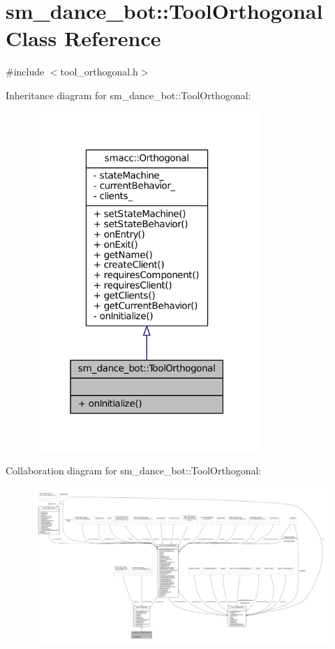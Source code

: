 \hypertarget{classsm__dance__bot_1_1ToolOrthogonal}{}\section{sm\+\_\+dance\+\_\+bot\+:\+:Tool\+Orthogonal Class Reference}
\label{classsm__dance__bot_1_1ToolOrthogonal}


{\ttfamily \#include $<$tool\+\_\+orthogonal.\+h$>$}



Inheritance diagram for sm\+\_\+dance\+\_\+bot\+:\+:Tool\+Orthogonal\+:
\nopagebreak
\begin{figure}[H]
\begin{center}
\leavevmode
\includegraphics[width=244pt]{classsm__dance__bot_1_1ToolOrthogonal__inherit__graph}
\end{center}
\end{figure}


Collaboration diagram for sm\+\_\+dance\+\_\+bot\+:\+:Tool\+Orthogonal\+:
\nopagebreak
\begin{figure}[H]
\begin{center}
\leavevmode
\includegraphics[width=350pt]{classsm__dance__bot_1_1ToolOrthogonal__coll__graph}
\end{center}
\end{figure}
